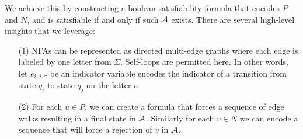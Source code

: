 \documentclass[12pt]{article}
\begin{document}
We achieve this by constructing a boolean satisfiability formula
that encodes \(P\) and \(N\),
and is satisfiable if and only if such \(\mathcal{A}\) exists.
There are several high-level insights that we leverage:
\begin{enumerate}
  \item[(1)]
    NFAs can be represented as directed multi-edge graphs
    where each edge is labeled by one letter from \(\Sigma\).
    Self-loops are permitted here.
    In other words, let \(e_{i, j, \sigma}\) be an indicator
    variable encodes the indicator of a transition from state \(q_i\)
    to state \(q_j\) on the letter \(\sigma\).

  \item[(2)]
    For each \(u \in P\),
    we can create a formula that forces a sequence of edge walks
    resulting in a final state in \(\mathcal{A}\).
    Similarly for each \(v \in N\) we can encode a sequence that will force
    a rejection of \(v\) in \(\mathcal{A}\).

\end{enumerate}
\end{document}
